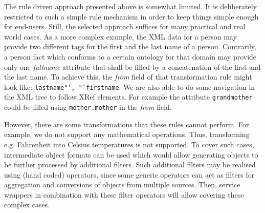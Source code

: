 The rule driven approach presented above is somewhat limited. It is deliberately restricted to such a simple rule mechanism in order to keep things simple enough for end-users. Still, the selected approach suffices for many practical and real world cases. As a more complex example, the XML data for a person may provide two different tags for the first and the last name of a person. Contrarily, a person fact which conforms to a certain ontology for that domain may provide only one \emph{fullname} attribute that shall be filled by a concatenation of the first and the last name. To achieve this, the \textit{from} field of that transformation rule might look like: \texttt{lastname"', "`firstname}. We are also able to do some navigation in the XML tree to follow XRef elements. For example the attribute \texttt{grandmother} could be filled using \texttt{mother.mother} in the \textit{from} field. 

However, there are some transformations that these rules cannot perform. For example, we do not support any mathematical operations. Thus, transforming e.g. Fahrenheit into Celsius temperatures is not supported. To cover such  cases, intermediate object formats can be used which would allow generating objects to be further processed by additional filters. Such additional filters may be realised using (hand coded) operators, since some generic operators can act as filters for aggregation and conversions of objects from multiple sources. Then, service wrappers in combination with these filter operators will allow covering these complex cases.


